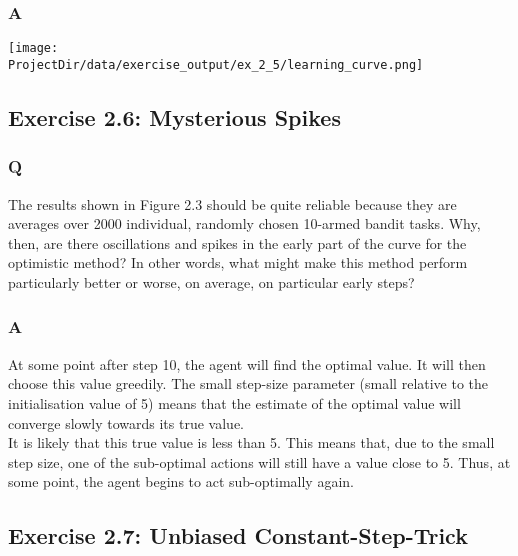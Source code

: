 \subsubsection*{A}
\ProgrammingExercise

\texttt{[image: \\ProjectDir/data/exercise\_output/ex\_2\_5/learning\_curve.png]}


\subsection{Exercise 2.6: Mysterious Spikes}
\subsubsection*{Q}
The results shown in Figure 2.3 should be quite reliable because they are averages over 2000 individual, randomly chosen 10-armed bandit tasks. Why, then, are there oscillations and spikes in the early part of the curve for the optimistic method? In other words, what might make this method perform particularly better or worse, on average, on particular early steps?

\subsubsection*{A}
At some point after step 10, the agent will find the optimal value. It will then choose this value greedily. The small step-size parameter (small relative to the initialisation value of 5) means that the estimate of the optimal value will converge slowly towards its true value.\\

It is likely that this true value is less than 5. This means that, due to the small step size, one of the sub-optimal actions will still have a value close to 5. Thus, at some point, the agent begins to act sub-optimally again.

\subsection{Exercise 2.7: Unbiased Constant-Step-Trick}
